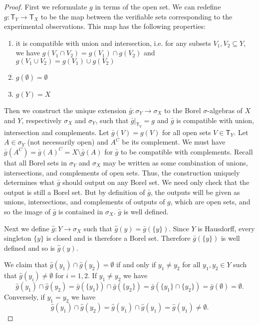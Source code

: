 \documentclass{amsart}
\theoremstyle{definition}
\numberwithin{equation}{section}
\begin{document}
\begin{proof}
	First we reformulate $g$ in terms of the open set. We can redefine $g: \mathsf{T}_Y \rightarrow \mathsf{T}_X$ to be the map between the verifiable sets corresponding to the experimental observations. This map has the following properties:
	\begin{enumerate}
		\item it is compatible with union and intersection, i.e. for any subsets $V_1, V_2 \subseteq Y$, we have $g(V_1 \cap V_2)=g(V_1)\cap g(V_2)$ and $g(V_1 \cup V_2)=g(V_1)\cup g(V_2)$
		\item $g(\emptyset) = \emptyset$
		\item $g(Y) = X$
	\end{enumerate}

	Then we construct the unique extension $\bar{g}:\sigma_Y\to\sigma_X$ to the Borel $\sigma$-algebras of $X$ and $Y$, respectively $\sigma_X$ and $\sigma_Y$, such that $\bar{g}|_{\mathsf{T}_Y}=g$ and $\bar{g}$ is compatible with union, intersection and complements. Let $\bar{g}(V) = g(V)$ for all open sets $V \in \mathsf{T}_Y$. Let $A \in \sigma_Y$ (not necessarily open) and $A^C$ be its complement. We must have $\bar{g}(A^C) = \bar{g}(A)^C = X\setminus \bar{g}(A)$ for $\bar{g}$ to be compatible with complements. Recall that all Borel sets in $\sigma_Y$ and $\sigma_X$ may be written as some combination of unions, intersections, and complements of open sets. Thus, the construction uniquely determines what $\bar{g}$ should output on any Borel set. We need only check that the output is still a Borel set. But by definition of $\bar{g}$, the outputs will be given as unions, intersections, and complements of outputs of $g$, which are open sets, and so the image of $\bar{g}$ is contained in $\sigma_X$.  $\bar{g}$ is well defined.
	
	Next we define $\hat{g}:Y\to\sigma_X$ such that $\hat{g}(y) = \bar{g}(\{y\})$. Since $Y$ is Hausdorff, every singleton $\{y\}$ is closed and is therefore a Borel set. Therefore $\bar{g}(\{y\})$ is well defined and so is $\hat{g}(y)$.
	
	We claim that $\hat{g}(y_1)\cap\hat{g}(y_2) = \emptyset$ if and only if $y_1\neq y_2$ for all $y_1,y_2\in Y$ such that $\hat{g}(y_i)\neq\emptyset$ for $i=1,2$. If $y_1\neq y_2$ we have
	$$
	\hat{g}(y_1)\cap\hat{g}(y_2) = \bar{g}(\{y_1\})\cap\bar{g}(\{y_2\}) = \bar{g}(\{y_1\}\cap\{y_2\}) = \bar{g}(\emptyset) = \emptyset.
	$$
	Conversely, if $y_1 = y_2$ we have
	$$
	\hat{g}(y_1)\cap\hat{g}(y_2) = 	\hat{g}(y_1)\cap\hat{g}(y_1) = 
	\hat{g}(y_1) \neq \emptyset.
	$$
	

\end{proof}
\end{document}
